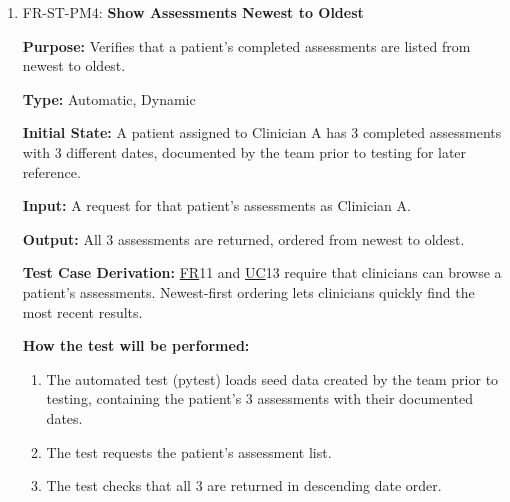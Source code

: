 \documentclass[12pt, titlepage]{article}
\newcommand{\srsfr}[1]{\href{https://github.com/Nour-Fawaz/MacaBoca/blob/main/pdfs/SRS/SRS.pdf}{FR}}
\newcommand{\srsuc}[1]{\href{https://github.com/Nour-Fawaz/MacaBoca/blob/main/pdfs/SRS/SRS.pdf}{UC}}
\renewcommand{\_}{\oldunderscore\allowbreak}
\begin{document}
\begin{enumerate}
  \item FR-ST-PM4: \textbf{Show Assessments Newest to Oldest\\}
  \begin{mdframed}[linewidth=0.5mm]
      \textbf{Purpose:} Verifies that a patient's completed assessments are listed from newest to oldest. \par
      \textbf{Type:} Automatic, Dynamic \par
      \textbf{Initial State:} A patient assigned to Clinician A has 3 completed assessments with 3 different dates, documented by the team prior to testing for later reference. \par
      \textbf{Input:} A request for that patient's assessments as Clinician A. \par
      \textbf{Output:} All 3 assessments are returned, ordered from newest to oldest. \par
      \textbf{Test Case Derivation:} \srsfr*{11} and \srsuc*{13} require that clinicians can browse a patient's assessments. Newest-first ordering lets clinicians quickly find the most recent results. \par
      \textbf{How the test will be performed:}
      \begin{enumerate}
          \item[1.] The automated test (pytest) loads seed data created by the team prior to testing, containing the patient's 3 assessments with their documented dates.
          \item[2.] The test requests the patient's assessment list.
          \item[3.] The test checks that all 3 are returned in descending date order.
      \end{enumerate}
  \end{mdframed}
\end{enumerate}
\end{document}
